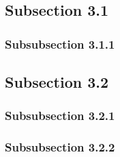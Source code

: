 \blindtext

\subsection{Subsection 3.1}

\subsubsection{Subsubsection 3.1.1}

\blindtext

\subsection{Subsection 3.2}

\blindtext

\subsubsection{Subsubsection 3.2.1}

\blindtext

\subsubsection{Subsubsection 3.2.2}

\blindtext


